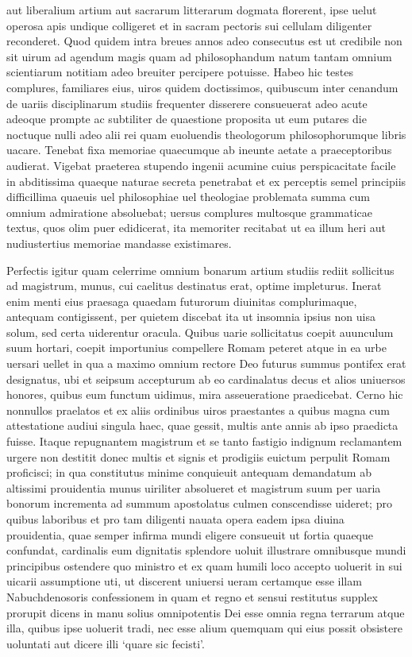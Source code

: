 \documentclass[a5paper,twoside]{article}
\begin{document}
aut liberalium artium aut sacrarum litterarum dogmata florerent, ipse uelut operosa apis undique colligeret et in sacram pectoris sui cellulam diligenter reconderet. Quod quidem intra breues annos adeo consecutus est ut credibile non sit uirum ad agendum magis quam ad philosophandum natum tantam omnium scientiarum notitiam adeo breuiter percipere potuisse. Habeo hic testes complures, familiares eius, uiros quidem doctissimos, quibuscum inter cenandum de uariis disciplinarum studiis frequenter disserere consueuerat adeo acute adeoque prompte ac subtiliter de quaestione proposita ut eum putares die noctuque nulli adeo alii rei quam euoluendis theologorum philosophorumque libris uacare. Tenebat fixa memoriae quaecumque ab ineunte aetate a praeceptoribus audierat. Vigebat praeterea stupendo ingenii acumine cuius perspicacitate facile in abditissima quaeque naturae secreta penetrabat et ex perceptis semel principiis difficillima quaeuis uel philosophiae uel theologiae problemata summa cum omnium admiratione absoluebat; uersus complures multosque grammaticae textus, quos olim puer edidicerat, ita memoriter recitabat ut ea illum heri aut nudiustertius memoriae mandasse existimares. 

Perfectis igitur quam celerrime omnium bonarum artium studiis rediit sollicitus ad magistrum, munus, cui caelitus destinatus erat, optime impleturus.  Inerat enim menti eius praesaga quaedam futurorum diuinitas complurimaque, antequam contigissent, per quietem discebat ita ut insomnia ipsius non uisa solum, sed certa uiderentur oracula. Quibus uarie sollicitatus coepit auunculum suum hortari, coepit importunius compellere Romam peteret atque in ea urbe uersari uellet in qua a maximo omnium rectore Deo futurus summus pontifex erat designatus, ubi et seipsum accepturum ab eo cardinalatus decus et alios uniuersos honores, quibus eum functum uidimus, mira asseueratione praedicebat. Cerno hic nonnullos praelatos et ex aliis ordinibus uiros praestantes a quibus magna cum attestatione audiui singula haec, quae gessit, multis ante annis ab ipso praedicta fuisse.  Itaque repugnantem magistrum et se tanto fastigio indignum reclamantem urgere non destitit donec multis et signis et prodigiis euictum perpulit Romam proficisci; in qua constitutus minime conquieuit antequam demandatum ab altissimi prouidentia munus uiriliter absolueret et magistrum suum per uaria bonorum incrementa ad summum apostolatus culmen conscendisse uideret; pro quibus laboribus et pro tam diligenti nauata opera eadem ipsa diuina prouidentia, quae semper infirma mundi eligere consueuit ut fortia quaeque confundat, cardinalis eum dignitatis splendore uoluit illustrare omnibusque mundi principibus ostendere quo ministro et ex quam humili loco accepto uoluerit in sui uicarii assumptione uti, ut discerent uniuersi ueram certamque esse illam Nabuchdenosoris confessionem in quam et regno et sensui restitutus supplex prorupit dicens in manu solius omnipotentis Dei esse omnia regna terrarum atque illa, quibus ipse uoluerit tradi, nec esse alium quemquam qui eius possit obsistere uoluntati aut dicere illi `quare sic fecisti'.
\end{document}
